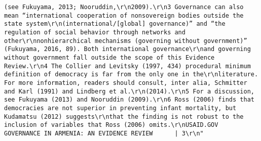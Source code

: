 \documentclass[
]{article}
\begin{document}
\begin{verbatim}
(see Fukuyama, 2013; Nooruddin,\r\n2009).\r\n3 Governance can also mean “international cooperation of nonsovereign bodies outside the state system\r\n(international/[global] governance)” and “the regulation of social behavior through networks and other\r\nnonhierarchical mechanisms (governing without government)” (Fukuyama, 2016, 89). Both international governance\r\nand governing without government fall outside the scope of this Evidence Review.\r\n4 The Collier and Levitsky (1997, 434) procedural minimum definition of democracy is far from the only one in the\r\nliterature. For more information, readers should consult, inter alia, Schmitter and Karl (1991) and Lindberg et al.\r\n(2014).\r\n5 For a discussion, see Fukuyama (2013) and Nooruddin (2009).\r\n6 Ross (2006) finds that democracies are not superior in preventing infant mortality, but Kudamatsu (2012) suggests\r\nthat the finding is not robust to the inclusion of variables that Ross (2006) omits.\r\nUSAID.GOV                                                          GOVERNANCE IN ARMENIA: AN EVIDENCE REVIEW      | 3\r\n"                                                                                                                                                                                                                                                                                                                                                                                                                                                                                                                                                                                                                                                

\end{verbatim}
\end{document}
